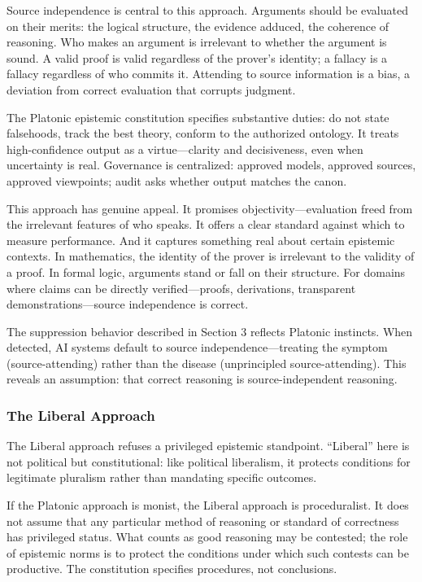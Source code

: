 Source independence is central to this approach. Arguments should be
evaluated on their merits: the logical structure, the evidence adduced,
the coherence of reasoning. Who makes an argument is irrelevant to
whether the argument is sound. A valid proof is valid regardless of the
prover's identity; a fallacy is a fallacy regardless of who commits it.
Attending to source information is a bias, a deviation from correct
evaluation that corrupts judgment.

The Platonic epistemic constitution specifies substantive duties: do not
state falsehoods, track the best theory, conform to the authorized
ontology. It treats high-confidence output as a virtue---clarity and
decisiveness, even when uncertainty is real. Governance is centralized:
approved models, approved sources, approved viewpoints; audit asks
whether output matches the canon.

This approach has genuine appeal. It promises objectivity---evaluation
freed from the irrelevant features of who speaks. It offers a clear
standard against which to measure performance. And it captures something
real about certain epistemic contexts. In mathematics, the identity of
the prover is irrelevant to the validity of a proof. In formal logic,
arguments stand or fall on their structure. For domains where claims can
be directly verified---proofs, derivations, transparent
demonstrations---source independence is correct.

The suppression behavior described in Section 3 reflects Platonic
instincts. When detected, AI systems default to source
independence---treating the symptom (source-attending) rather than the
disease (unprincipled source-attending). This reveals an assumption:
that correct reasoning is source-independent reasoning.

\subsubsection{The Liberal Approach}\label{the-liberal-approach}

The Liberal approach refuses a privileged epistemic standpoint.
``Liberal'' here is not political but constitutional: like political
liberalism, it protects conditions for legitimate pluralism rather than
mandating specific outcomes.

If the Platonic approach is monist, the Liberal approach is
proceduralist. It does not assume that any particular method of
reasoning or standard of correctness has privileged status. What counts
as good reasoning may be contested; the role of epistemic norms is to
protect the conditions under which such contests can be productive. The
constitution specifies procedures, not conclusions.

